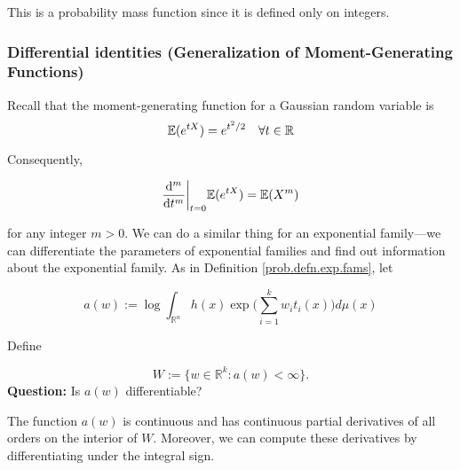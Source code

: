 \begin{remark} This is a probability mass function since it is defined only on integers.

\end{remark}

\subsubsection{Differential identities (Generalization of Moment-Generating Functions)} Recall that the moment-generating function for a Gaussian random variable is 
\[
\E(e^{tX}) = e^{t^2/2} \ \ \ \forall t \in \mathbb{R}
\]

Consequently,

\[
\deriv{^m}{t^m} \bigg|_{t=0} \E(e^{tX}) = \E(X^m)
\]

for any integer \(m > 0\). We can do a similar thing for an exponential family---we can differentiate the parameters of exponential families and find out information about the exponential family. As in Definition \ref{prob.defn.exp.fams}, let 

\[
a(w) := \log \int_{\mathbb{R}^n} h(x) \exp \bigg(\sum_{i=1}^k w_i t_i(x) \bigg) d\mu(x)
\]

Define 

\[
W:= \{w \in \mathbb{R}^k : a(w) < \infty\}.
\]
\textbf{Question:} Is \(a(w)\) differentiable?

\begin{lemma} \label{prob.541a.lemma.3.8}The function \(a(w)\) is continuous and has continuous partial derivatives of all orders on the interior of \(W\). Moreover, we can compute these derivatives by differentiating under the integral sign.

\end{lemma}

